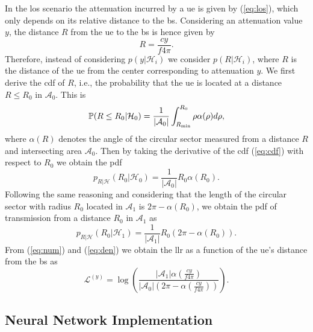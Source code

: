 \documentclass[conference,draftcls,onecolumn]{IEEEtran}
\begin{document}
In the \ac{los} scenario the attenuation incurred by a \ac{ue} is given by (\ref{eq:los}), which only depends on its relative distance to the \ac{bs}. Considering an attenuation value $y$, the distance $R$ from the \ac{ue} to the \ac{bs} is hence given by 
\begin{equation}
    R = \frac{c y}{f 4 \pi}.
\end{equation}
Therefore, instead of considering $p(y|\mathcal H_i)$ we consider $p(R|\mathcal H_i)$, where $R$ is the distance of the \ac{ue} from the center corresponding to attenuation $y$. We first derive the \ac{cdf} of $R$, i.e.,  the probability that the \ac{ue} is located at a distance $R\le R_0$ in $\mathcal{A}_0$. This is
\begin{equation}\label{eq:cdf}
     \mathbb{P}(R \le R_0|\mathcal{H}_0) = \frac{1}{|\mathcal{A}_0|}\int_{R_{\rm min}}^{R_0} \rho \alpha(\rho) d\rho,
\end{equation}
where $\alpha(R)$ denotes the angle of the circular sector measured from a distance $R$ and intersecting area $\mathcal{A}_0$. Then by taking the derivative of the \ac{cdf} (\ref{eq:cdf}) with respect to $R_0$ we obtain the \ac{pdf} 
\begin{equation}\label{eq:num}
    p_{R|\mathcal{H}}(R_0|\mathcal{H}_0) = \frac{1}{|\mathcal{A}_0|}R_0\alpha(R_0).
\end{equation}
Following the same reasoning and considering that the length of the circular sector with radius $R_0$ located in $\mathcal{A}_1$ is $2\pi - \alpha(R_0)$, we obtain the \ac{pdf} of transmission from a distance $R_0$ in $\mathcal{A}_1$ as
\begin{equation}\label{eq:den}
     p_{R|\mathcal{H}}(R_0|\mathcal{H}_1) = \frac{1}{|\mathcal{A}_1|}R_0\left(2\pi-\alpha(R_0)\right).
\end{equation}
From (\ref{eq:num}) and (\ref{eq:den}) we obtain the \ac{llr} as a function of the \ac{ue}'s distance from the \ac{bs} as 
\begin{equation}
    \mathcal{L}^{(y)}=\log\left(\frac{|\mathcal{A}_1|\alpha(\frac{c y}{f 4 \pi})}{|\mathcal{A}_0|\left(2\pi-\alpha(\frac{c y}{f 4 \pi})\right)}\right).
\end{equation}

\subsection{Neural Network Implementation}\label{sec:nn}
\end{document}
